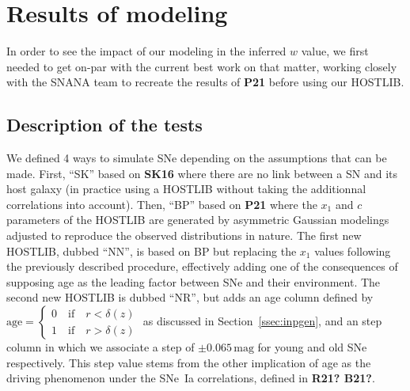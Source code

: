 \documentclass[]{aa}
\begin{document}




\section{Results of modeling}\label{sec:results}
In order to see the impact of our modeling in the inferred $w$ value, we first
needed to get on-par with the current best work on that matter, working closely
with the SNANA team to recreate the results of \textbf{P21} before using our
HOSTLIB.

\subsection{Description of the tests}\label{ssec:kinds}
We defined 4 ways to simulate SNe depending on the assumptions that can be made.
First, ``SK'' based on \textbf{SK16} where there are no link between a SN and
its host galaxy (in practice using a HOSTLIB without taking the additionnal
correlations into account). Then, ``BP'' based on \textbf{P21} where the $x_1$
and $c$ parameters of the HOSTLIB are generated by asymmetric Gaussian modelings
adjusted to reproduce the observed distributions in nature. The first new
HOSTLIB, dubbed ``NN'', is based on BP but replacing the $x_1$ values following
the previously described procedure, effectively adding one of the consequences
of supposing age as the leading factor between SNe and their environment. The
second new HOSTLIB is dubbed ``NR'', but adds an age column defined by
$\mathrm{age} = \left\{
    \begin{array}{l}
        0 \quad \mathrm{if} \quad r < \delta(z)\\
        1 \quad \mathrm{if} \quad r > \delta(z)
    \end{array}
\right.$ as discussed in Section~\ref{ssec:inpgen}, and an step column in which
we associate a step of $\pm0.065\,\mathrm{mag}$ for young and old SNe
respectively. This step value stems from the other implication of age as the
driving phenomenon under the SNe~Ia correlations, defined in \textbf{R21? B21?}.
\end{document}

